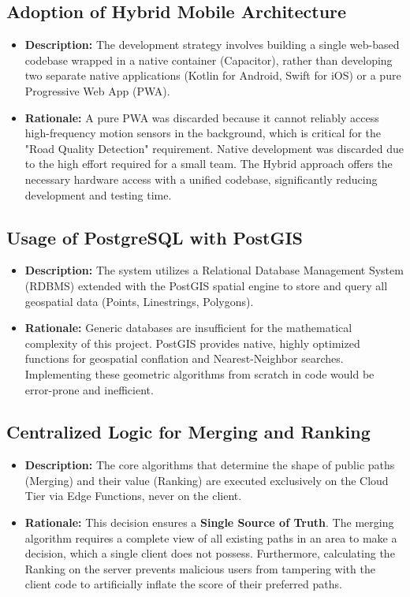 \subsection{Adoption of Hybrid Mobile Architecture}
\begin{itemize}
    \item \textbf{Description:} The development strategy involves building a single web-based codebase wrapped in a native container (Capacitor), rather than developing two separate native applications (Kotlin for Android, Swift for iOS) or a pure Progressive Web App (PWA).
    \item \textbf{Rationale:} A pure PWA was discarded because it cannot reliably access high-frequency motion sensors in the background, which is critical for the "Road Quality Detection" requirement. Native development was discarded due to the high effort required for a small team. The Hybrid approach offers the necessary hardware access with a unified codebase, significantly reducing development and testing time.
\end{itemize}

\subsection{Usage of PostgreSQL with PostGIS}
\begin{itemize}
    \item \textbf{Description:} The system utilizes a Relational Database Management System (RDBMS) extended with the PostGIS spatial engine to store and query all geospatial data (Points, Linestrings, Polygons).
    \item \textbf{Rationale:} Generic databases are insufficient for the mathematical complexity of this project. PostGIS provides native, highly optimized functions for geospatial conflation and Nearest-Neighbor searches. Implementing these geometric algorithms from scratch in code would be error-prone and inefficient.
\end{itemize}

\subsection{Centralized Logic for Merging and Ranking}
\begin{itemize}
    \item \textbf{Description:} The core algorithms that determine the shape of public paths (Merging) and their value (Ranking) are executed exclusively on the Cloud Tier via Edge Functions, never on the client.
    \item \textbf{Rationale:} This decision ensures a \textbf{Single Source of Truth}. The merging algorithm requires a complete view of all existing paths in an area to make a decision, which a single client does not possess. Furthermore, calculating the Ranking on the server prevents malicious users from tampering with the client code to artificially inflate the score of their preferred paths.
\end{itemize}

